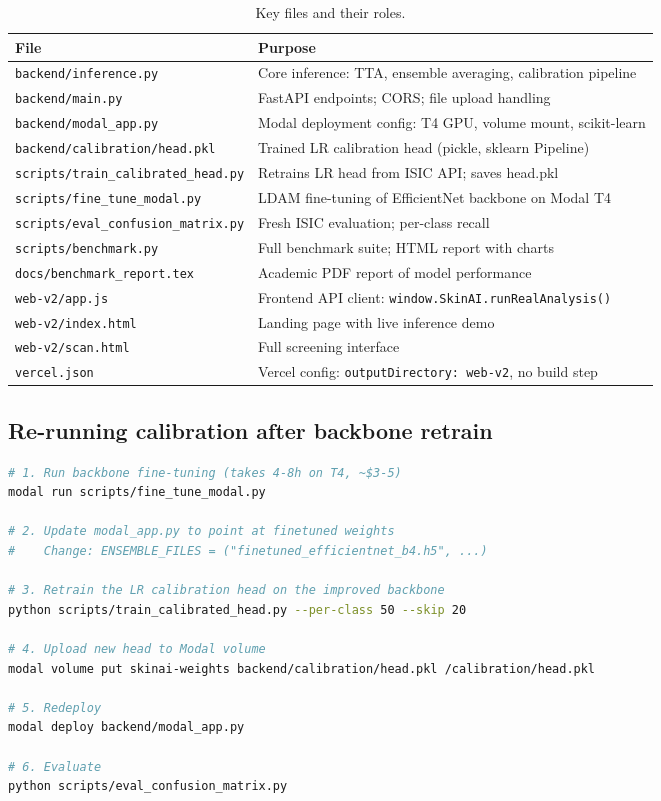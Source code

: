 \documentclass[12pt,a4paper]{article}
\begin{document}
\begin{table}[h]
\centering
\begin{tabular}{lp{9cm}}
\toprule
\textbf{File} & \textbf{Purpose} \\
\midrule
\texttt{backend/inference.py} & Core inference: TTA, ensemble averaging, calibration pipeline \\
\texttt{backend/main.py} & FastAPI endpoints; CORS; file upload handling \\
\texttt{backend/modal\_app.py} & Modal deployment config: T4 GPU, volume mount, scikit-learn \\
\texttt{backend/calibration/head.pkl} & Trained LR calibration head (pickle, sklearn Pipeline) \\
\texttt{scripts/train\_calibrated\_head.py} & Retrains LR head from ISIC API; saves head.pkl \\
\texttt{scripts/fine\_tune\_modal.py} & LDAM fine-tuning of EfficientNet backbone on Modal T4 \\
\texttt{scripts/eval\_confusion\_matrix.py} & Fresh ISIC evaluation; per-class recall \\
\texttt{scripts/benchmark.py} & Full benchmark suite; HTML report with charts \\
\texttt{docs/benchmark\_report.tex} & Academic PDF report of model performance \\
\texttt{web-v2/app.js} & Frontend API client: \texttt{window.SkinAI.runRealAnalysis()} \\
\texttt{web-v2/index.html} & Landing page with live inference demo \\
\texttt{web-v2/scan.html} & Full screening interface \\
\texttt{vercel.json} & Vercel config: \texttt{outputDirectory: web-v2}, no build step \\
\bottomrule
\end{tabular}
\caption{Key files and their roles.}
\end{table}

\subsection{Re-running calibration after backbone retrain}

\begin{lstlisting}[language=bash]
# 1. Run backbone fine-tuning (takes 4-8h on T4, ~$3-5)
modal run scripts/fine_tune_modal.py

# 2. Update modal_app.py to point at finetuned weights
#    Change: ENSEMBLE_FILES = ("finetuned_efficientnet_b4.h5", ...)

# 3. Retrain the LR calibration head on the improved backbone
python scripts/train_calibrated_head.py --per-class 50 --skip 20

# 4. Upload new head to Modal volume
modal volume put skinai-weights backend/calibration/head.pkl /calibration/head.pkl

# 5. Redeploy
modal deploy backend/modal_app.py

# 6. Evaluate
python scripts/eval_confusion_matrix.py
\end{lstlisting}
\end{document}
